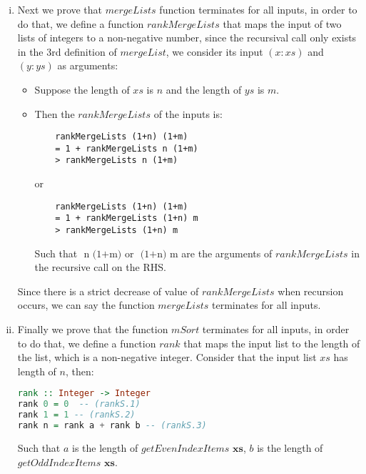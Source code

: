 \documentclass[11pt]{article}
\theoremstyle{definition}
\begin{document}
\begin{enumerate}
\begin{enumerate}[(a)]
\begin{enumerate}[i.]
\item Next we prove that $mergeLists$ function terminates for all inputs, in order to do that, we define a 
function $rankMergeLists$ that maps the input of two lists of integers to a non-negative number, since the recursival call
only exists in the 3rd definition of $mergeList$, we consider its input $(x:xs)$ and $(y:ys)$ as arguments:
\begin{itemize}
	\item Suppose the length of $xs$ is $n$ and the length of $ys$ is $m$.
	\item Then the $rankMergeLists$ of the inputs is:
	\begin{verbatim}
	rankMergeLists (1+n) (1+m)
	= 1 + rankMergeLists n (1+m)
	> rankMergeLists n (1+m)
	\end{verbatim}
	or
	\begin{verbatim}
	rankMergeLists (1+n) (1+m)
	= 1 + rankMergeLists (1+n) m
	> rankMergeLists (1+n) m
	\end{verbatim}
	Such that $\text{ n (1+m)}$ or $\text{ (1+n) m}$ are the arguments of $rankMergeLists$ in the recursive call on
	the RHS. 
\end{itemize}
Since there is a strict decrease of value of $rankMergeLists$ when recursion occurs, we can say the function 
$mergeLists$ terminates for all inputs.

\item Finally we prove that the function $mSort$ terminates for all inputs, in order to do that, we define a function
$rank$ that maps the input list to the length of the list, which is a non-negative integer.
Consider that the input list $xs$ has length of $n$, then:

\begin{lstlisting}[language=Haskell]
rank :: Integer -> Integer
rank 0 = 0	-- (rankS.1)
rank 1 = 1 -- (rankS.2)
rank n = rank a + rank b -- (rankS.3)
\end{lstlisting}
Such that $a$ is the length of $getEvenIndexItems \textbf{ xs}$, $b$ is the length of \\
$getOddIndexItems \textbf{ xs}$.


\end{enumerate}
\end{enumerate}
\end{enumerate}
\end{document}
